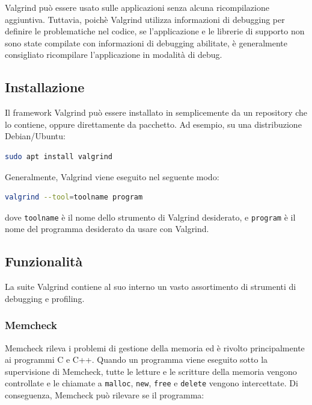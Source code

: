 \documentclass{article}
\begin{document}
Valgrind può essere usato sulle applicazioni senza alcuna ricompilazione
aggiuntiva. Tuttavia, poichè Valgrind utilizza informazioni di debugging per
definire le problematiche nel codice, se l'applicazione e le librerie di
supporto non sono state compilate con informazioni di debugging abilitate, è
generalmente consigliato ricompilare l'applicazione in modalità di debug.

\subsection{Installazione}
\label{sec:valgrind:installazione}

Il framework Valgrind può essere installato in semplicemente da un repository
che lo contiene, oppure direttamente da pacchetto. Ad esempio, su
una distribuzione Debian/Ubuntu: \\

\begin{lstlisting}[language=bash]
sudo apt install valgrind
\end{lstlisting}

Generalmente, Valgrind viene eseguito nel seguente modo:

\begin{lstlisting}[language=bash]
valgrind --tool=toolname program
\end{lstlisting}
dove \texttt{toolname} è il nome dello strumento di Valgrind desiderato, e
\texttt{program} è il nome del programma desiderato da usare con Valgrind.

\subsection{Funzionalità}
\label{sec:valgrind:funzionalita}

La suite Valgrind contiene al suo interno un vasto assortimento di strumenti di
debugging e profiling.

\subsubsection{Memcheck}

Memcheck rileva i problemi di gestione della memoria ed è
rivolto principalmente ai programmi C e C++. Quando un programma viene eseguito
sotto la supervisione di Memcheck, tutte le letture e le scritture della memoria
vengono controllate e le chiamate a \texttt{malloc}, \texttt{new}, \texttt{free}
e \texttt{delete} vengono intercettate. Di conseguenza, Memcheck può rilevare se
il programma:
\end{document}
